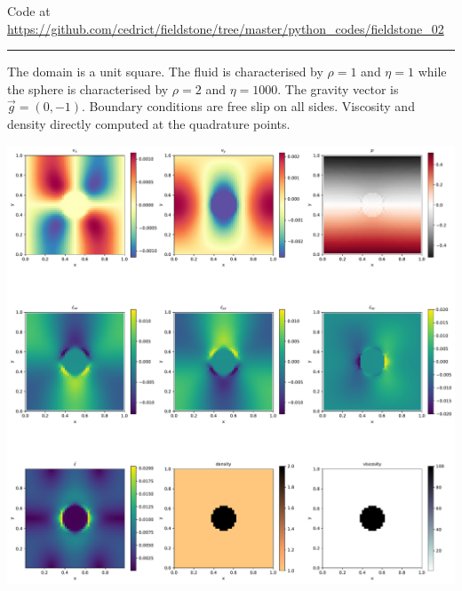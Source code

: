 

\begin{center}
Code at \url{https://github.com/cedrict/fieldstone/tree/master/python_codes/fieldstone_02}
\end{center}

\par\noindent\rule{\textwidth}{0.4pt}

The domain is a unit square. The fluid is characterised 
by $\rho=1$ and $\eta=1$ 
while the sphere is characterised 
by $\rho=2$ and $\eta=1000$.
The gravity vector is $\vec{g}=(0,-1)$. 
Boundary conditions are free slip on all sides.
Viscosity and density directly computed at the quadrature points.

\includegraphics[width=15cm]{python_codes/fieldstone_02/solution.pdf}


